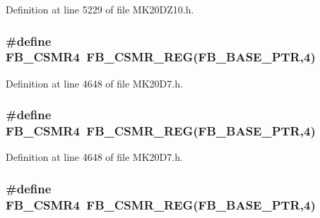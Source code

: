 Definition at line 5229 of file M\+K20\+D\+Z10.\+h.

\subsubsection[{\texorpdfstring{F\+B\+\_\+\+C\+S\+M\+R4}{FB_CSMR4}}]{\setlength{\rightskip}{0pt plus 5cm}\#define F\+B\+\_\+\+C\+S\+M\+R4~{\bf F\+B\+\_\+\+C\+S\+M\+R\+\_\+\+R\+EG}({\bf F\+B\+\_\+\+B\+A\+S\+E\+\_\+\+P\+TR},4)}\hypertarget{group___f_b___register___accessor___macros_ga33bb04f006bbb7cbcd2e2f72a999949c}{}\label{group___f_b___register___accessor___macros_ga33bb04f006bbb7cbcd2e2f72a999949c}


Definition at line 4648 of file M\+K20\+D7.\+h.

\subsubsection[{\texorpdfstring{F\+B\+\_\+\+C\+S\+M\+R4}{FB_CSMR4}}]{\setlength{\rightskip}{0pt plus 5cm}\#define F\+B\+\_\+\+C\+S\+M\+R4~{\bf F\+B\+\_\+\+C\+S\+M\+R\+\_\+\+R\+EG}({\bf F\+B\+\_\+\+B\+A\+S\+E\+\_\+\+P\+TR},4)}\hypertarget{group___f_b___register___accessor___macros_ga33bb04f006bbb7cbcd2e2f72a999949c}{}\label{group___f_b___register___accessor___macros_ga33bb04f006bbb7cbcd2e2f72a999949c}


Definition at line 4648 of file M\+K20\+D7.\+h.

\subsubsection[{\texorpdfstring{F\+B\+\_\+\+C\+S\+M\+R4}{FB_CSMR4}}]{\setlength{\rightskip}{0pt plus 5cm}\#define F\+B\+\_\+\+C\+S\+M\+R4~{\bf F\+B\+\_\+\+C\+S\+M\+R\+\_\+\+R\+EG}({\bf F\+B\+\_\+\+B\+A\+S\+E\+\_\+\+P\+TR},4)}\hypertarget{group___f_b___register___accessor___macros_ga33bb04f006bbb7cbcd2e2f72a999949c}{}\label{group___f_b___register___accessor___macros_ga33bb04f006bbb7cbcd2e2f72a999949c}


